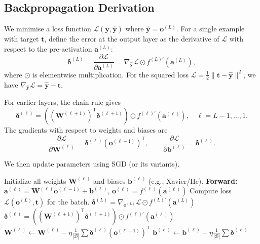 \documentclass{tufte-handout}
\let\subsubsection\subsection
\begin{document}
\subsubsection{Backpropagation Derivation}

We minimise a loss function $\mathcal{L}(\mathbf{y}, \hat{\mathbf{y}})$ where $\hat{\mathbf{y}} = \mathbf{o}^{(L)}$. For a single example with target $\mathbf{t}$, define the error at the output layer as the derivative of $\mathcal{L}$ with respect to the pre‑activation $\mathbf{a}^{(L)}$:
\[
\boldsymbol{\delta}^{(L)} = \frac{\partial \mathcal{L}}{\partial \mathbf{a}^{(L)}} = \nabla_{\hat{\mathbf{y}}}\mathcal{L} \odot f^{(L)'}(\mathbf{a}^{(L)}),
\]
where $\odot$ is elementwise multiplication. For the squared loss $\mathcal{L} = \frac{1}{2}\|\mathbf{t}-\hat{\mathbf{y}}\|^2$, we have $\nabla_{\hat{\mathbf{y}}}\mathcal{L} = \hat{\mathbf{y}} - \mathbf{t}$.

For earlier layers, the chain rule gives
\[
\boldsymbol{\delta}^{(\ell)} = \left( (\mathbf{W}^{(\ell+1)})^{\mathsf{T}} \boldsymbol{\delta}^{(\ell+1)} \right) \odot f^{(\ell)'}(\mathbf{a}^{(\ell)}),\quad \ell = L-1,\dots,1.
\]
The gradients with respect to weights and biases are
\[
\frac{\partial \mathcal{L}}{\partial \mathbf{W}^{(\ell)}} = \boldsymbol{\delta}^{(\ell)} (\mathbf{o}^{(\ell-1)})^{\mathsf{T}},\qquad
\frac{\partial \mathcal{L}}{\partial \mathbf{b}^{(\ell)}} = \boldsymbol{\delta}^{(\ell)}.
\]

We then update parameters using SGD (or its variants).

\begin{algorithm}[h]
    \caption{Backpropagation (online / mini‑batch)}
    \begin{algorithmic}[1]
        \STATE Initialize all weights $\mathbf{W}^{(\ell)}$ and biases $\mathbf{b}^{(\ell)}$ (e.g., Xavier/He).
             \STATE \textbf{Forward:} $\mathbf{a}^{(\ell)} = \mathbf{W}^{(\ell)}\mathbf{o}^{(\ell-1)} + \mathbf{b}^{(\ell)}$, $\mathbf{o}^{(\ell)} = f^{(\ell)}(\mathbf{a}^{(\ell)})$ \ENDFOR
            \STATE Compute loss $\mathcal{L}(\mathbf{o}^{(L)}, \mathbf{t})$ for the batch.
            \STATE $\boldsymbol{\delta}^{(L)} = \nabla_{\mathbf{o}^{(L)}}\mathcal{L} \odot f^{(L)'}(\mathbf{a}^{(L)})$
                \STATE $\boldsymbol{\delta}^{(\ell)} = \left( (\mathbf{W}^{(\ell+1)})^{\mathsf{T}} \boldsymbol{\delta}^{(\ell+1)} \right) \odot f^{(\ell)'}(\mathbf{a}^{(\ell)})$
            \ENDFOR
                \STATE $\mathbf{W}^{(\ell)} \leftarrow \mathbf{W}^{(\ell)} - \eta \frac{1}{|\mathcal{B}|} \sum \boldsymbol{\delta}^{(\ell)} (\mathbf{o}^{(\ell-1)})^{\mathsf{T}}$
                \STATE $\mathbf{b}^{(\ell)} \leftarrow \mathbf{b}^{(\ell)} - \eta \frac{1}{|\mathcal{B}|} \sum \boldsymbol{\delta}^{(\ell)}$
            \ENDFOR
        \ENDFOR
    \end{algorithmic}
\end{algorithm}
\end{document}

